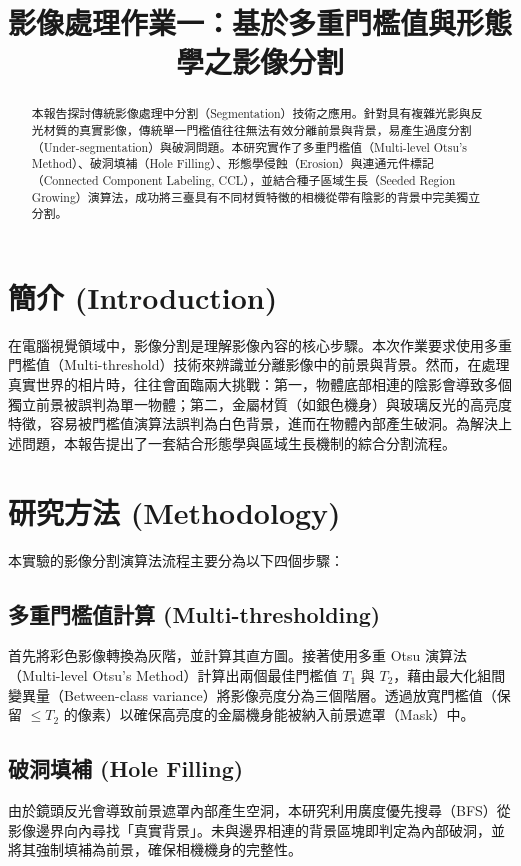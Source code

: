 \documentclass[conference]{IEEEtran}
\title{影像處理作業一：基於多重門檻值與形態學之影像分割}
\author{\IEEEauthorblockN{蔡晟旭} %
\IEEEauthorblockA{學號：1113405013}}
\begin{document}
\maketitle

\begin{abstract}
本報告探討傳統影像處理中分割（Segmentation）技術之應用。針對具有複雜光影與反光材質的真實影像，傳統單一門檻值往往無法有效分離前景與背景，易產生過度分割（Under-segmentation）與破洞問題。本研究實作了多重門檻值（Multi-level Otsu's Method）、破洞填補（Hole Filling）、形態學侵蝕（Erosion）與連通元件標記（Connected Component Labeling, CCL），並結合種子區域生長（Seeded Region Growing）演算法，成功將三臺具有不同材質特徵的相機從帶有陰影的背景中完美獨立分割。
\end{abstract}

\vspace{0.5cm}

\section{簡介 (Introduction)}
在電腦視覺領域中，影像分割是理解影像內容的核心步驟。本次作業要求使用多重門檻值（Multi-threshold）技術來辨識並分離影像中的前景與背景。然而，在處理真實世界的相片時，往往會面臨兩大挑戰：第一，物體底部相連的陰影會導致多個獨立前景被誤判為單一物體；第二，金屬材質（如銀色機身）與玻璃反光的高亮度特徵，容易被門檻值演算法誤判為白色背景，進而在物體內部產生破洞。為解決上述問題，本報告提出了一套結合形態學與區域生長機制的綜合分割流程。

\section{研究方法 (Methodology)}
本實驗的影像分割演算法流程主要分為以下四個步驟：

\subsection{多重門檻值計算 (Multi-thresholding)}
首先將彩色影像轉換為灰階，並計算其直方圖。接著使用多重 Otsu 演算法（Multi-level Otsu's Method）計算出兩個最佳門檻值 $T_1$ 與 $T_2$，藉由最大化組間變異量（Between-class variance）將影像亮度分為三個階層。透過放寬門檻值（保留 $\le T_2$ 的像素）以確保高亮度的金屬機身能被納入前景遮罩（Mask）中。

\subsection{破洞填補 (Hole Filling)}
由於鏡頭反光會導致前景遮罩內部產生空洞，本研究利用廣度優先搜尋（BFS）從影像邊界向內尋找「真實背景」。未與邊界相連的背景區塊即判定為內部破洞，並將其強制填補為前景，確保相機機身的完整性。
\end{document}
